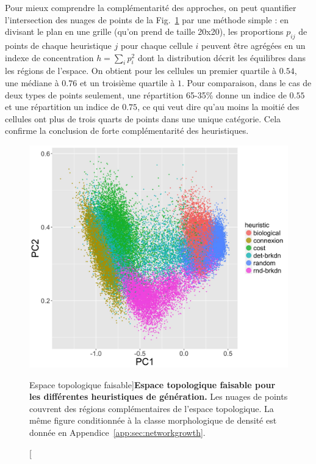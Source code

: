 
Pour mieux comprendre la complémentarité des approches, on peut quantifier l'intersection des nuages de points de la Fig.~\ref{fig:networkgrowth:feasiblespace} par une méthode simple : en divisant le plan en une grille (qu'on prend de taille 20x20), les proportions $p_{ij}$ de points de chaque heuristique $j$ pour chaque cellule $i$ peuvent être agrégées en un indexe de concentration $h = \sum_i p_i^2$ dont la distribution décrit les équilibres dans les régions de l'espace. On obtient pour les cellules un premier quartile à $0.54$, une médiane à $0.76$ et un troisième quartile à $1$. Pour comparaison, dans le cas de deux types de points seulement, une répartition 65-35\% donne un indice de $0.55$ et une répartition un indice de $0.75$, ce qui veut dire qu'au moins la moitié des cellules ont plus de trois quarts de points dans une unique catégorie. Cela confirme la conclusion de forte complémentarité des heuristiques.


\begin{figure}
\includegraphics[width=\linewidth]{Figures/Final/7-1-2-fig-networkgrowth-feasiblespace.jpg}
\caption[Feasible topological space][Espace topologique faisable]{}{\textbf{Espace topologique faisable pour les différentes heuristiques de génération.} Les nuages de points couvrent des régions complémentaires de l'espace topologique. La même figure conditionnée à la classe morphologique de densité est donnée en Appendice~\ref{app:sec:networkgrowth}.\label{fig:networkgrowth:feasiblespace}}
\end{figure}


